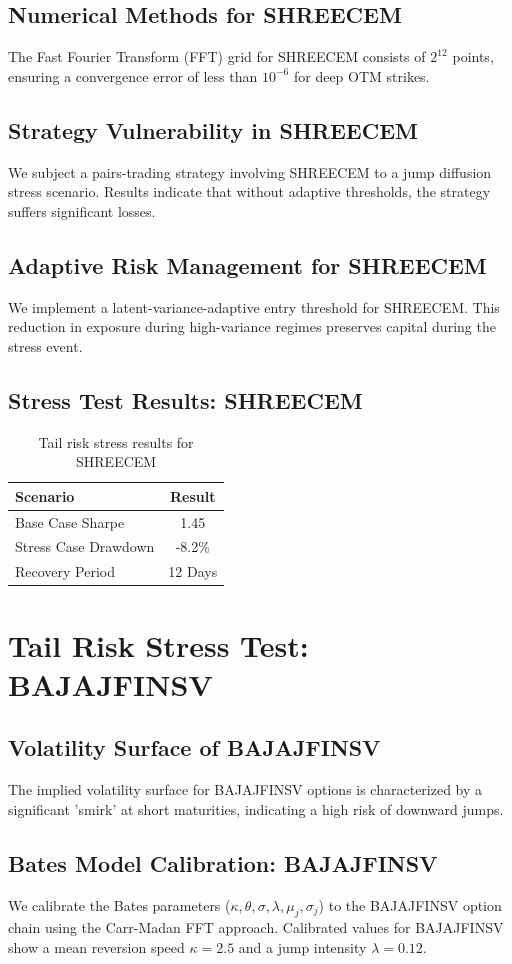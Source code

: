 \documentclass[12pt,a4paper,twoside]{article}
\begin{document}
\subsection{Numerical Methods for SHREECEM}
The Fast Fourier Transform (FFT) grid for SHREECEM consists of $2^{12}$ points, ensuring a convergence error of less than $10^{-6}$ for deep OTM strikes.
\subsection{Strategy Vulnerability in SHREECEM}
We subject a pairs-trading strategy involving SHREECEM to a jump diffusion stress scenario. Results indicate that without adaptive thresholds, the strategy suffers significant losses.
\subsection{Adaptive Risk Management for SHREECEM}
We implement a latent-variance-adaptive entry threshold for SHREECEM. This reduction in exposure during high-variance regimes preserves capital during the stress event.
\subsection{Stress Test Results: SHREECEM}
\begin{table}[H]
\centering
\begin{tabular}{|l|c|}
\hline
Scenario & Result \\
\hline
Base Case Sharpe & 1.45 \\
Stress Case Drawdown & -8.2\% \\
Recovery Period & 12 Days \\
\hline
\end{tabular}
\caption{Tail risk stress results for SHREECEM}
\end{table}
\newpage

\section{Tail Risk Stress Test: BAJAJFINSV}
\subsection{Volatility Surface of BAJAJFINSV}
The implied volatility surface for BAJAJFINSV options is characterized by a significant 'smirk' at short maturities, indicating a high risk of downward jumps.
\subsection{Bates Model Calibration: BAJAJFINSV}
We calibrate the Bates parameters ($\kappa, \theta, \sigma, \lambda, \mu_j, \sigma_j$) to the BAJAJFINSV option chain using the Carr-Madan FFT approach.
Calibrated values for BAJAJFINSV show a mean reversion speed $\kappa = 2.5$ and a jump intensity $\lambda = 0.12$.
\end{document}
